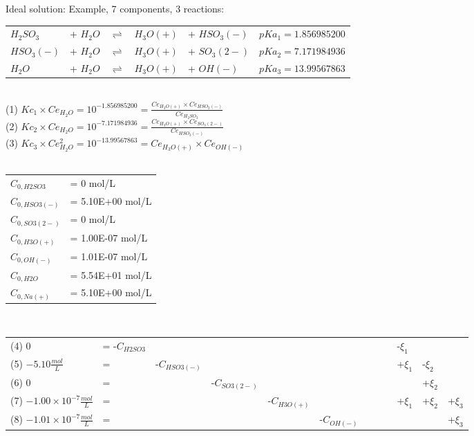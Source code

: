 \documentclass[6pt,a4paper,oneside,preview]{standalone}
\begin{document}
\begin{landscape}
Ideal solution:
Example, 7 components, 3 reactions: \\
\begin{tabular}{llcll|l}
\hline
$H_2SO_3$ & + $H_2O$ & $\rightleftharpoons$ & $H_3O(+)$ & + $HSO_3(-)$ & $pKa_1=1.856985200$ \\
$HSO_3(-)$ & + $H_2O$ & $\rightleftharpoons$ & $H_3O(+)$ & + $SO_3(2-)$ & $pKa_2=7.171984936$ \\
$H_2O$ & + $H_2O$ & $\rightleftharpoons$ & $H_3O(+)$ & + $OH(-)$ & $pKa_3=13.99567863$\\
\hline
\end{tabular}
\\
(1) $Kc_1 \times Ce_{H_2O} = 10^{-1.856985200} = \frac{Ce_{H_3O(+)} \times Ce_{HSO_3(-)}}{Ce_{H_2SO_3}}$
\\
(2) $Kc_2 \times Ce_{H_2O} = 10^{-7.171984936} = \frac{Ce_{H_3O(+)} \times Ce_{SO_3(2-)}}{Ce_{HSO_3(-)}}$
\\
(3) $Kc_3 \times Ce_{H_2O}^2 = 10^{-13.99567863} = Ce_{H_3O(+)} \times Ce_{OH(-)}$\\
\\
\begin{tabular}{ll}
\hline
$C_{0,H2SO3}$ & = 0 mol/L\\ 
$C_{0,HSO3(-)}$ & = 5.10E+00 mol/L \\ 
$C_{0,SO3(2-)}$ & = 0 mol/L \\ 
$C_{0,H3O(+)}$ & = 1.00E-07 mol/L \\ 
$C_{0,OH(-)}$ & = 1.01E-07 mol/L \\ 
$C_{0,H2O}$ & = 5.54E+01 mol/L \\ 
$C_{0,Na(+)}$ & = 5.10E+00 mol/L \\ 
\hline
\end{tabular} 
\\
\begin{tabular}{llllllllllll}
(4) 0 &= -$C_{H2SO3}$  &  &  &  &  &  &  &  & -$\xi_1$ & & \\
(5) $-5.10\frac{mol}{L}$ &=  & -$C_{HSO3(-)}$  &  &  &  &  &  &  & +$\xi_1$ & -$\xi_2$ &  \\
(6) 0 &=  &  &  -$C_{SO3(2-)}$  &  &  &  &  &  &  & +$\xi_2$ &  \\
(7) $-1.00 \times 10^{-7} \frac{mol}{L}$ &=  &  &  & -$C_{H3O(+)}$  &   &  &  &  & +$\xi_1$ & +$\xi_2$ & +$\xi_3$  \\
(8) $-1.01 \times 10^{-7} \frac{mol}{L}$  &= &  &  &  & -$C_{OH(-)}$  &  &  &  &  & & +$\xi_3$ \\

\end{tabular}
\end{landscape}
\end{document}
